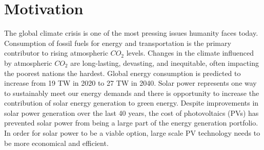 \section*{Motivation}

The global climate crisis is one of the most pressing issues humanity faces today.
Consumption of fossil fuels for energy and transportation is the primary contributor to rising atmospheric $CO_{2}$ levels\cite{Solomon2009a}.
Changes in the climate influenced by atmospheric $CO_{2}$ are long-lasting, devasting, and inequitable, often impacting the poorest nations the hardest.
Global energy consumption is predicted to increase from 19 TW in 2020 to 27 TW in 2040\cite{Mazzio2015, ieo2020}.
Solar power represents one way to sustainably meet our energy demands and there is opportunity to increase the contribution of solar energy generation to green energy.
Despite improvements in solar power generation over the last 40 years, the cost of photovoltaics (PVs) has prevented solar power from being a large part of the energy generation portfolio.
In order for solar power to be a viable option, large scale PV technology needs to be more economical and efficient\cite{Mazzio2015,Espinosa2012}.

